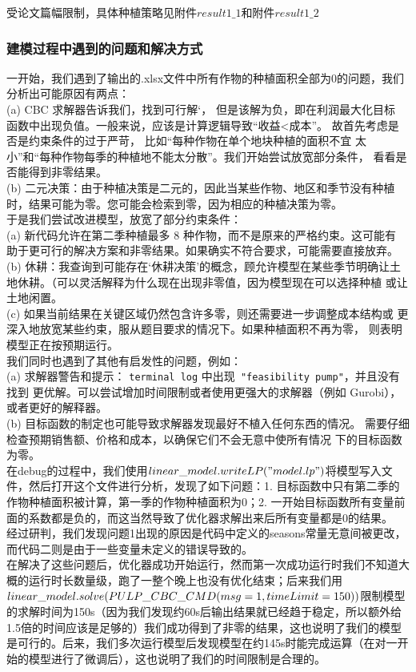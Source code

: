 \documentclass[withoutpreface]{cumcmthesis}
\begin{document}
受论文篇幅限制，具体种植策略见附件$result1\_1$和附件$result1\_2$

\subsubsection{建模过程中遇到的问题和解决方式}
一开始，我们遇到了输出的.xlsx文件中所有作物的种植面积全部为0的问题，我们分析出可能原因有两点：\\
(a) CBC 求解器告诉我们，找到可行解‘， 但是该解为负，即在利润最大化目标
函数中出现负值。一般来说，应该是计算逻辑导致“收益<成本”。 故首先考虑是否是约束条件的过于严苛， 比如“每种作物在单个地块种植的面积不宜
太小”和“每种作物每季的种植地不能太分散”。我们开始尝试放宽部分条件，
看看是否能得到非零结果。\\
(b) 二元决策：由于种植决策是二元的，因此当某些作物、地区和季节没有种植
时，结果可能为零。您可能会检索到零，因为相应的种植决策为零。\\

于是我们尝试改进模型，放宽了部分约束条件：\\
(a) 新代码允许在第二季种植最多 8 种作物，而不是原来的严格约束。这可能有
助于更可行的解决方案和非零结果。如果确实不符合要求，可能需要直接放弃。 \\
(b) 休耕：我查询到可能存在‘休耕决策’的概念，顾允许模型在某些季节明确让土
地休耕。（可以灵活解释为什么现在出现非零值，因为模型现在可以选择种植
或让土地闲置。 \\
(c) 如果当前结果在关键区域仍然包含许多零，则还需要进一步调整成本结构或
更深入地放宽某些约束，服从题目要求的情况下。如果种植面积不再为零，
则表明模型正在按预期运行。 \\

我们同时也遇到了其他有启发性的问题，例如：\\
(a) 求解器警告和提示： \verb|terminal log| 中出现\verb| "feasibility pump"|，并且没有找到
更优解。可以尝试增加时间限制或者使用更强大的求解器（例如 Gurobi），
或者更好的解释器。 \\
(b) 目标函数的制定也可能导致求解器发现最好不植入任何东西的情况。
需要仔细检查预期销售额、价格和成本，以确保它们不会无意中使所有情况
下的目标函数为零。 \\

在debug的过程中，我们使用$ linear\_model.writeLP("model.lp") $将模型写入文件，然后打开这个文件进行分析，发现了如下问题：1. 目标函数中只有第二季的作物种植面积被计算，第一季的作物种植面积为0；2. 一开始目标函数所有变量前面的系数都是负的，而这当然导致了优化器求解出来后所有变量都是0的结果。\\
经过研判，我们发现问题1出现的原因是代码中定义的seasons常量无意间被更改，而代码二则是由于一些变量未定义的错误导致的。\\
在解决了这些问题后，优化器成功开始运行，然而第一次成功运行时我们不知道大概的运行时长数量级，跑了一整个晚上也没有优化结束；后来我们用 $ linear\_model.solve(PU\\LP\_CBC\_CMD(msg=1, timeLimit=150)) $限制模型的求解时间为150s（因为我们发现约60s后输出结果就已经趋于稳定，所以额外给1.5倍的时间应该是足够的）我们成功得到了非零的结果，这也说明了我们的模型是可行的。后来，我们多次运行模型后发现模型在约145s时能完成运算（在对一开始的模型进行了微调后），这也说明了我们的时间限制是合理的。
\end{document}
